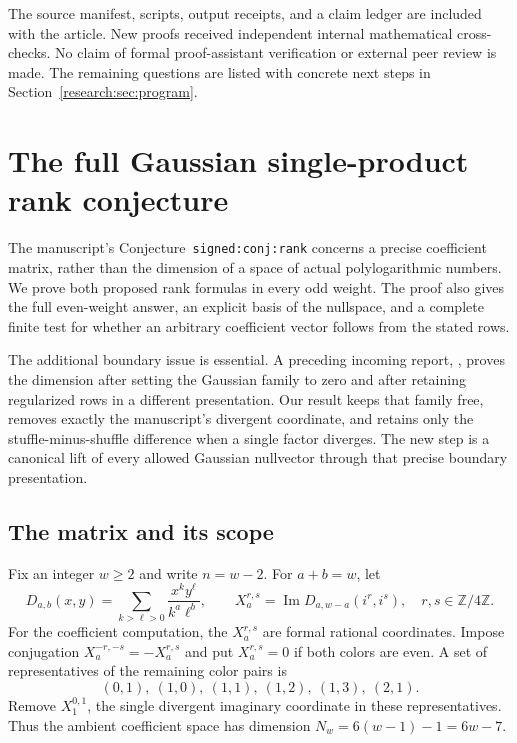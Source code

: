 \documentclass[11pt,a4paper]{article}
\theoremstyle{definition}
\theoremstyle{remark}
\numberwithin{equation}{section}
\begin{document}
The source manifest, scripts, output receipts, and a claim ledger are
included with the article. New proofs received independent internal
mathematical cross-checks. No claim of formal proof-assistant
verification or external peer review is made. The remaining questions
are listed with concrete next steps in Section~\ref{research:sec:program}.
\section{The full Gaussian single-product rank conjecture}
\label{fg:sec:rank}

The manuscript's Conjecture~\texttt{signed:conj:rank} concerns a precise
coefficient matrix, rather than the dimension of a space of actual
polylogarithmic numbers. We prove both proposed rank formulas in every
odd weight. The proof also gives the full even-weight answer, an explicit
basis of the nullspace, and a complete finite test for whether an arbitrary
coefficient vector follows from the stated rows.

The additional boundary issue is essential. A preceding incoming report,
, proves the dimension after
setting the Gaussian family to zero and after retaining regularized rows
in a different presentation. Our result keeps that family free, removes
exactly the manuscript's divergent coordinate, and retains only the
stuffle-minus-shuffle difference when a single factor diverges. The new
step is a canonical lift of every allowed Gaussian nullvector through
that precise boundary presentation.

\subsection{The matrix and its scope}

Fix an integer $w\ge2$ and write $n=w-2$. For $a+b=w$, let
\[
 D_{a,b}(x,y)=\sum_{k>\ell>0}\frac{x^ky^\ell}{k^a\ell^b},
 \qquad X_a^{r,s}=\operatorname{Im}D_{a,w-a}(i^r,i^s),
 \quad r,s\in\mathbb Z/4\mathbb Z.
\]
For the coefficient computation, the $X_a^{r,s}$ are formal rational
coordinates. Impose conjugation
$X_a^{-r,-s}=-X_a^{r,s}$ and put $X_a^{r,s}=0$ if both colors are even.
A set of representatives of the remaining color pairs is
\begin{equation}\label{fg:eq:pairs}
 (0,1),\ (1,0),\ (1,1),\ (1,2),\ (1,3),\ (2,1).
\end{equation}
Remove $X_1^{0,1}$, the single divergent imaginary coordinate in these
representatives. Thus the ambient coefficient space has dimension
$N_w=6(w-1)-1=6w-7$.
\end{document}
